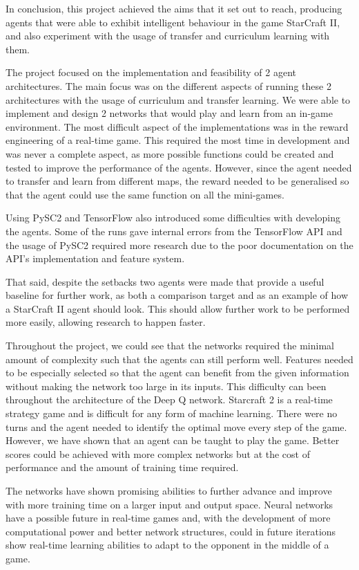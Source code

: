 In conclusion, this project achieved the aims that it set out to reach,
producing agents that were able to exhibit intelligent behaviour in the game
StarCraft II, and also experiment with the usage of transfer and curriculum
learning with them.

The project focused on the implementation and feasibility of 2 agent
architectures. The main focus was on the different aspects of running these 2
architectures with the usage of curriculum and transfer learning. We were able
to implement and design 2 networks that would play and learn from an in-game
environment. The most difficult aspect of the implementations was in the reward
engineering of a real-time game. This required the most time in development and
was never a complete aspect, as more possible functions could be created and
tested to improve the performance of the agents. However, since the agent needed
to transfer and learn from different maps, the reward needed to be generalised
so that the agent could use the same function on all the mini-games.

Using PySC2 and TensorFlow also introduced some difficulties with developing the
agents. Some of the runs gave internal errors from the TensorFlow API and the
usage of PySC2 required more research due to the poor documentation on the API's
implementation and feature system.

That said, despite the setbacks two agents were made that provide a useful
baseline for further work, as both a comparison target and as an example of how
a StarCraft II agent should look. This should allow further work to be performed
more easily, allowing research to happen faster.

Throughout the project, we could see that the networks required the minimal amount of complexity such that the agents can still perform well. Features needed to be especially selected so that the agent can benefit from the given information without making the network too large in its inputs. This difficulty can been throughout the architecture of the Deep Q network. Starcraft 2 is a real-time strategy game and is difficult for any form of machine learning. There were no turns and the agent needed to identify the optimal move every step of the game. However, we have shown that an agent can be taught to play the game. Better scores could be achieved with more complex networks but at the cost of performance and the amount of training time required. 

The networks have shown promising abilities to further advance and improve with more training time on a larger input and output space. Neural networks have a possible future in real-time games and, with the development of more computational power and better network structures, could in future iterations show real-time learning abilities to adapt to the opponent in the middle of a game.